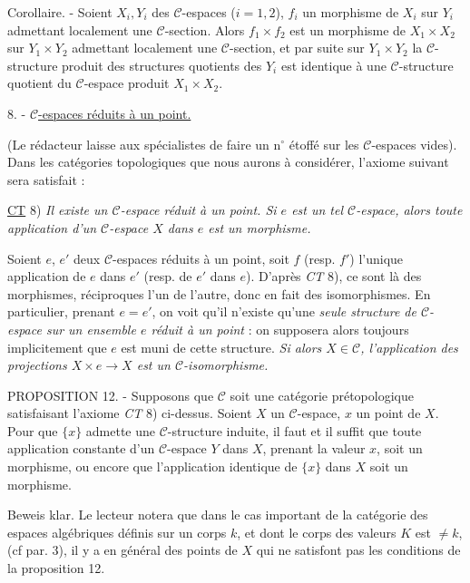 Corollaire. - Soient $X_i, Y_i$ des $\mathcal{C}$-espaces ($i=1,2$), $f_i$ un morphisme
de $X_i$ sur $Y_i$ admettant localement une $\mathcal{C}$-section. Alors $f_1 \times f_2$ est un
morphisme de $X_1 \times X_2$ sur $Y_1 \times Y_2$ admettant localement une $\mathcal{C}$-section, et
par suite sur $Y_1 \times Y_2$ la $\mathcal{C}$-structure produit des structures quotients
des $Y_i$ est identique à une $\mathcal{C}$-structure quotient du $\mathcal{C}$-espace produit
$X_1 \times X_2$.

8. - \underline{$\mathcal{C}$-espaces réduits à un point.}

(Le rédacteur laisse aux spécialistes de faire un n$^\circ$ étoffé sur les
$\mathcal{C}$-espaces vides). Dans les catégories topologiques que nous aurons à
considérer, l'axiome suivant sera satisfait :

\newpage



\underline{CT} 8) \emph{Il existe un $\mathcal{C}$-espace réduit à un point. Si $e$ est un tel $\mathcal{C}$-espace, alors toute application d'un $\mathcal{C}$-espace $X$ dans $e$ est un morphisme.}

Soient $e$, $e'$ deux $\mathcal{C}$-espaces réduits à un point, soit $f$ (resp. $f'$) l'unique application de $e$ dans $e'$ (resp. de $e'$ dans $e$). D'après \emph{CT} 8), ce sont là des morphismes, réciproques l'un de l'autre, donc en fait des isomorphismes. En particulier, prenant $e=e'$, on voit qu'il n'existe qu'une \emph{seule structure de $\mathcal{C}$-espace sur un ensemble $e$ réduit à un point} : on supposera alors toujours implicitement que $e$ est muni de cette structure. \emph{Si alors $X \in \mathcal{C}$, l'application des projections $X \times e \to X$ est un $\mathcal{C}$-isomorphisme.}

PROPOSITION 12. - Supposons que $\mathcal{C}$ soit une catégorie prétopologique satisfaisant l'axiome \emph{CT} 8) ci-dessus. Soient $X$ un $\mathcal{C}$-espace, $x$ un point de $X$. Pour que $\{x\}$ admette une $\mathcal{C}$-structure induite, il faut et il suffit que toute application constante d'un $\mathcal{C}$-espace $Y$ dans $X$, prenant la valeur $x$, soit un morphisme, ou encore que l'application identique de $\{x\}$ dans $X$ soit un morphisme.

Beweis klar. Le lecteur notera que dans le cas important de la catégorie des espaces algébriques définis sur un corps $k$, et dont le corps des valeurs $K$ est $\neq k$, (cf par. 3), il y a en général des points de $X$ qui ne satisfont pas les conditions de la proposition 12.

